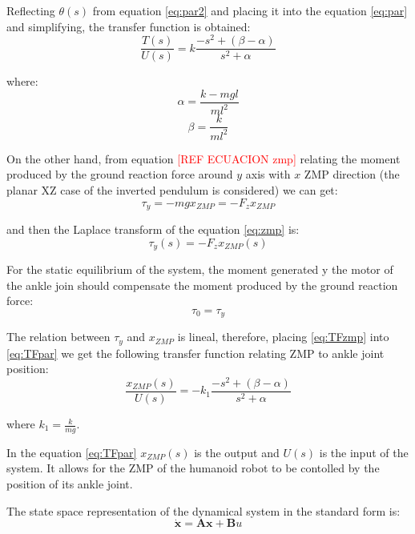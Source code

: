 Reflecting $\theta(s)$ from equation \eqref{eq:par2} and placing it into the equation \eqref{eq:par} and simplifying, the transfer function is obtained:
\begin{equation}
\frac{T(s)}{U(s)} = k \frac{-s^2+(\beta - \alpha)}{s^2 + \alpha}
\label{eq:TFpar}
\end{equation}

where:
\begin{equation}
\alpha = \frac{k-mgl}{ml^2}
\end{equation}
\begin{equation}
\beta = \frac{k}{ml^2}
\end{equation}

On the other hand, from equation \textcolor{red}{[REF ECUACION zmp]} relating the moment produced by the ground reaction force around $y$ axis with $x$ ZMP direction (the planar XZ case of the inverted pendulum is considered) we can get:
\begin{equation}
\tau_y = -mgx_{ZMP} = - F_z x_{ZMP}
\label{eq:zmp}
\end{equation} 

and then the Laplace transform of the equation \eqref{eq:zmp} is:
\begin{equation}
\tau_y(s) = - F_z x_{ZMP}(s)
\label{eq:TFzmp}
\end{equation}

For the static equilibrium of the system, the moment generated y the motor of the ankle join should compensate the moment produced by the ground reaction force:
\begin{equation}
\tau_0 = \tau_y
\end{equation}

The relation between $\tau_y$ and $x_{ZMP}$ is lineal, therefore, placing \eqref{eq:TFzmp} into \eqref{eq:TFpar} we get the following transfer function relating ZMP to ankle joint position: 
\begin{equation}
\frac{x_{ZMP}(s)}{U(s)} = - k_1 \frac{-s^2+(\beta - \alpha)}{s^2 + \alpha}
\end{equation}

where $k_1 = \frac{k}{mg}$.

In the equation \eqref{eq:TFpar} $x_{ZMP}(s)$ is the output and $U(s)$ is the input of the system. It allows for the ZMP of the humanoid robot to be contolled by the position of its ankle joint. 

The state space representation of the dynamical system in the standard form is:
\begin{equation}
\mathbf{\dot{x}} = \mathbf{A}\textbf{x} + \mathbf{B}u
\label{eq:ss1}
\end{equation}

